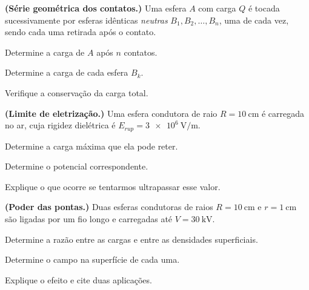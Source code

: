 \blocodesafio
\begin{questao}[4]{}

\textbf{(Série geométrica dos contatos.)} Uma esfera $A$ com carga $Q$ é
tocada sucessivamente por esferas idênticas \emph{neutras}
$B_1,B_2,\dots,B_n$, uma de cada vez, sendo cada uma retirada após o contato.
\begin{itensq}
\item Determine a carga de $A$ após $n$ contatos.
\item Determine a carga de cada esfera $B_k$.
\item Verifique a conservação da carga total.
\end{itensq}


\end{questao}
\begin{questao}[4]{}

\textbf{(Limite de eletrização.)} Uma esfera condutora de raio
$R=\SI{10}{\centi\meter}$ é carregada no ar, cuja rigidez dielétrica é
$E_{rup}=\SI{3e6}{\volt\per\meter}$.
\begin{itensq}
\item Determine a carga máxima que ela pode reter.
\item Determine o potencial correspondente.
\item Explique o que ocorre se tentarmos ultrapassar esse valor.
\end{itensq}


\end{questao}
\begin{questao}[4]{}

\textbf{(Poder das pontas.)} Duas esferas condutoras de raios
$R=\SI{10}{\centi\meter}$ e $r=\SI{1}{\centi\meter}$ são ligadas por um fio
longo e carregadas até $V=\SI{30}{\kilo\volt}$.
\begin{itensq}
\item Determine a razão entre as cargas e entre as densidades superficiais.
\item Determine o campo na superfície de cada uma.
\item Explique o efeito e cite duas aplicações.
\end{itensq}


\end{questao}
